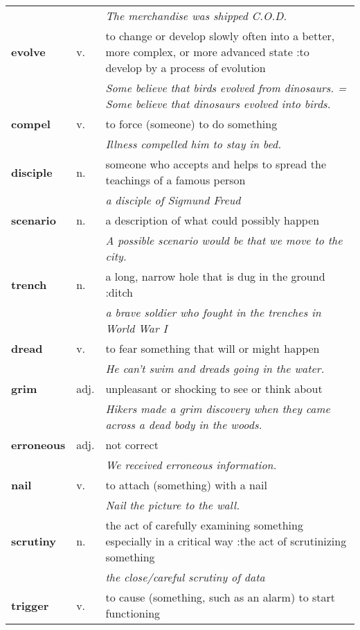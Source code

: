 \documentclass[a4paper]{article}
\begin{document}
\begin{longtable}{llp{11cm}}
 & & \textit{The merchandise was shipped C.O.D.}\\[0.08cm]
\textbf{evolve} & v. &  to change or develop slowly often into a better, more complex, or more advanced state :to develop by a process of evolution \\
 & & \textit{Some believe that birds evolved from dinosaurs. = Some believe that dinosaurs evolved into birds.}\\[0.08cm]
\textbf{compel} & v. &  to force (someone) to do something \\
 & & \textit{Illness compelled him to stay in bed.}\\[0.08cm]
\textbf{disciple} & n. &  someone who accepts and helps to spread the teachings of a famous person \\
 & & \textit{a disciple of Sigmund Freud}\\[0.08cm]
\textbf{scenario} & n. &  a description of what could possibly happen \\
 & & \textit{A possible scenario would be that we move to the city.}\\[0.08cm]
\textbf{trench} & n. &  a long, narrow hole that is dug in the ground :ditch\\
 & & \textit{a brave soldier who fought in the trenches in World War I}\\[0.08cm]
\textbf{dread} & v. &  to fear something that will or might happen \\
 & & \textit{He can't swim and dreads going in the water.}\\[0.08cm]
\textbf{grim} & adj. &  unpleasant or shocking to see or think about \\
 & & \textit{Hikers made a grim discovery when they came across a dead body in the woods.}\\[0.08cm]
\textbf{erroneous} & adj. &  not correct \\
 & & \textit{We received erroneous information.}\\[0.08cm]
\textbf{nail} & v. &  to attach (something) with a nail \\
 & & \textit{Nail the picture to the wall.}\\[0.08cm]
\textbf{scrutiny} & n. &  the act of carefully examining something especially in a critical way :the act of scrutinizing something \\
 & & \textit{the close/careful scrutiny of data}\\[0.08cm]
\textbf{trigger} & v. &  to cause (something, such as an alarm) to start functioning \\

\end{longtable}
\end{document}

